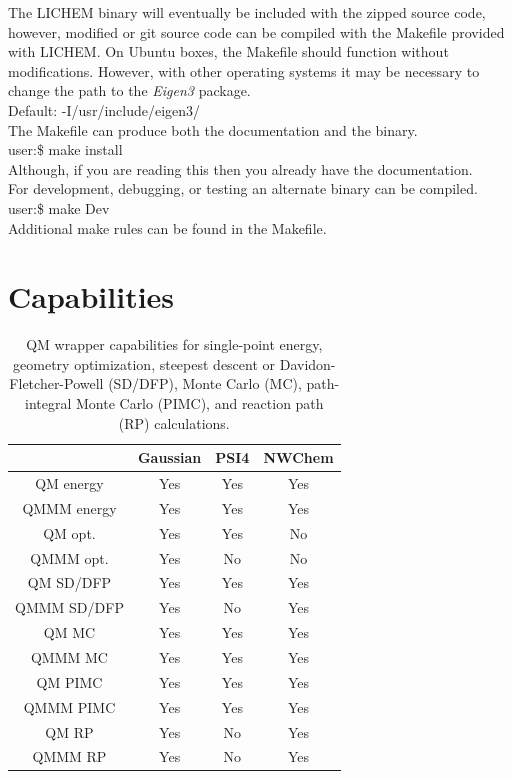 \documentclass[12pt]{report}
\begin{document}
The LICHEM binary will eventually be included with the zipped source code,
however, modified or git source code can be compiled with the Makefile
provided with LICHEM.
On Ubuntu boxes, the Makefile should function without modifications.
However, with other operating systems it may be necessary to change the path
to the \textit{Eigen3} package. \\

Default: -I/usr/include/eigen3/ \\

The Makefile can produce both the documentation and the binary. \\

user:\$ make install \\

Although, if you are reading this then you already have the documentation. \\

For development, debugging, or testing an alternate binary can be compiled. \\

user:\$ make Dev \\

Additional make rules can be found in the Makefile.

\section{Capabilities}

\begin{table}[hbt]
 \centering
 \begin{tabular}{|c|c c c|}
 \hline
  & Gaussian & PSI4 & NWChem \\ \hline
 QM energy & Yes & Yes & Yes \\
 QMMM energy & Yes & Yes & Yes \\ \hline
 QM opt. & Yes & Yes & No \\
 QMMM opt. & Yes & No & No \\ \hline
 QM SD/DFP & Yes & Yes & Yes \\
 QMMM SD/DFP & Yes & No & Yes \\ \hline
 QM MC & Yes & Yes & Yes \\
 QMMM MC & Yes & Yes & Yes\\ \hline
 QM PIMC & Yes & Yes & Yes \\
 QMMM PIMC & Yes & Yes & Yes \\ \hline
 QM RP & Yes & No & Yes\\
 QMMM RP & Yes & No & Yes \\ \hline
 \end{tabular}
 \caption{
 QM wrapper capabilities for single-point energy, geometry optimization,
 steepest descent or Davidon-Fletcher-Powell (SD/DFP), Monte Carlo (MC),
 path-integral Monte Carlo (PIMC), and reaction path (RP) calculations.}
 \label{tab:QMWrapCap}
\end{table}
\end{document}
